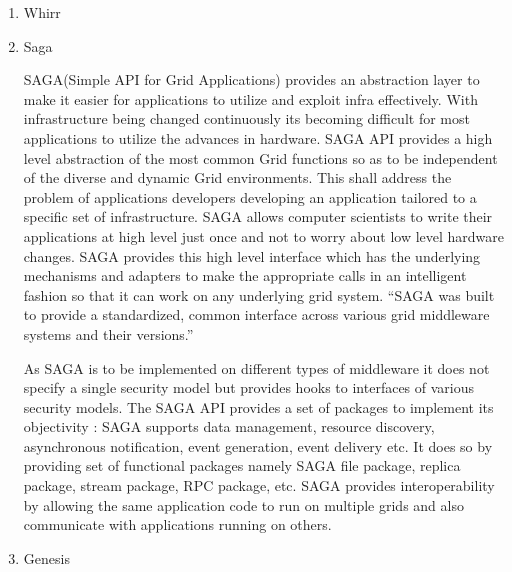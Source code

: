 \begin{enumerate}
\item {} 
Whirr

\item {} 
Saga

SAGA(Simple API for Grid Applications) provides an abstraction
layer to make it easier for applications to utilize and exploit
infra effectively. With infrastructure being changed continuously
its becoming difficult for most applications to utilize the
advances in hardware. SAGA API provides a high level abstraction
of the most common Grid functions so as to be independent of the
diverse and dynamic Grid environments. \label{\detokenize{i524/technologies:id570}}{\hyperref[\detokenize{i524/technologies:saga-paper}]{\sphinxcrossref{{[}490{]}}}} This
shall address the problem of applications developers developing
an application tailored to a specific set of infrastructure.
SAGA allows computer scientists to write their applications at
high level just once and not to worry about low level hardware
changes. SAGA provides this high level interface which has the
underlying mechanisms and adapters to make the appropriate calls
in an intelligent fashion so that it can work on any underlying
grid system. “SAGA was built to provide a standardized, common
interface across various grid middleware systems and their
versions.”  \label{\detokenize{i524/technologies:id571}}{\hyperref[\detokenize{i524/technologies:www-saga-ogf-document}]{\sphinxcrossref{{[}491{]}}}}

As SAGA is to be implemented on different types of middleware it
does not specify a single security model but provides hooks to
interfaces of various security models. The SAGA API provides a
set of packages to implement its objectivity : SAGA supports data
management, resource discovery, asynchronous notification, event
generation, event delivery etc. It does so by providing set of
functional packages namely SAGA file package, replica package,
stream package, RPC package, etc. SAGA provides interoperability
by allowing the same application code to run on multiple grids
and also communicate with applications running on
others. \label{\detokenize{i524/technologies:id572}}{\hyperref[\detokenize{i524/technologies:saga-paper}]{\sphinxcrossref{{[}490{]}}}}

\item {} 
Genesis

\end{enumerate}


